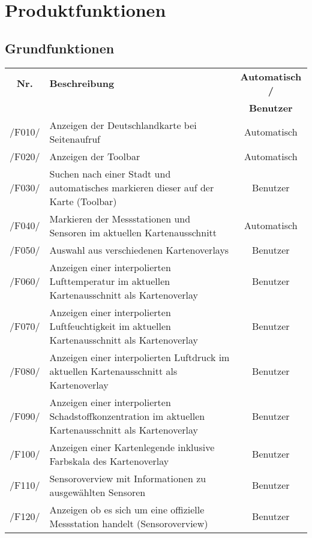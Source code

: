 \clearpage
\section{Produktfunktionen}
\subsection{Grundfunktionen}
\begin{tabularx}{\textwidth}{| c | X | c |}
\hline
        \textbf{Nr.} & 
        \textbf{Beschreibung} & 
        \textbf{Automatisch /} \\
        & & \textbf{Benutzer} \\
        \hline
        /F010/ & Anzeigen der Deutschlandkarte bei Seitenaufruf & Automatisch \\
        \hline
        /F020/ & Anzeigen der Toolbar & Automatisch \\
        \hline
        /F030/ & Suchen nach einer Stadt und automatisches markieren dieser auf der Karte (Toolbar) & Benutzer \\
        \hline
        /F040/ & Markieren der Messstationen und Sensoren im aktuellen Kartenausschnitt & Automatisch \\
        \hline
        /F050/ & Auswahl aus verschiedenen Kartenoverlays & Benutzer \\
        \hline
        /F060/ & Anzeigen einer interpolierten Lufttemperatur im aktuellen Kartenausschnitt als Kartenoverlay & Benutzer \\
        \hline
        /F070/ & Anzeigen einer interpolierten Luftfeuchtigkeit im aktuellen Kartenausschnitt als Kartenoverlay & Benutzer \\
        \hline
        /F080/ & Anzeigen einer interpolierten Luftdruck im aktuellen Kartenausschnitt als Kartenoverlay & Benutzer \\
        \hline
        /F090/ & Anzeigen einer interpolierten Schadstoffkonzentration im aktuellen Kartenausschnitt als Kartenoverlay & Benutzer \\
        \hline
        /F100/ & Anzeigen einer Kartenlegende inklusive Farbskala des Kartenoverlay & Benutzer \\
        \hline
        /F110/ & Sensoroverview mit Informationen zu ausgewählten Sensoren & Benutzer \\
        \hline
        /F120/ & Anzeigen ob es sich um eine offizielle Messstation handelt (Sensoroverview) & Benutzer \\
        \hline

\end{tabularx}
